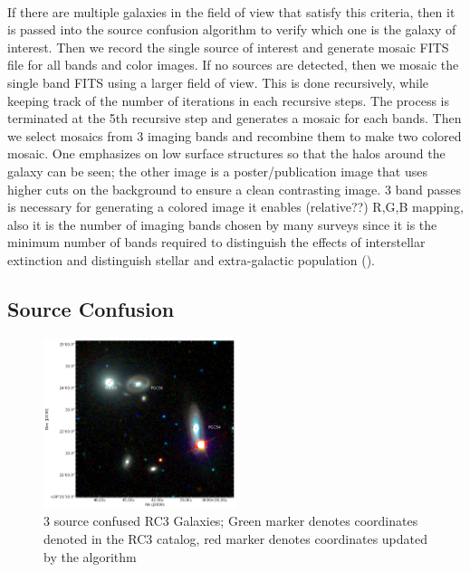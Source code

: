 \documentclass[5p]{elsarticle}
\begin{document}
\\
\indent If there are multiple galaxies in the field of view that satisfy this criteria, then it is passed into the source confusion algorithm to verify which one is the galaxy of interest. Then we record the single source of interest and generate mosaic FITS file for all bands and color images. If no sources are detected, then we mosaic  the single band FITS using a larger field of view. This is done recursively, while keeping track of the number of iterations in each recursive steps. The process is terminated at the 5th recursive step and generates a mosaic for each bands. Then we select mosaics from 3 imaging bands  and recombine them to make two  colored mosaic. One emphasizes on low surface structures  so that the halos around the galaxy can be seen; the other image is a poster/publication image that uses higher cuts on the background to ensure a clean contrasting image. 3 band passes is necessary for generating a colored image it enables (relative??) R,G,B mapping, also it is the number of imaging bands chosen by many surveys since it is the minimum number of bands required to distinguish the effects of interstellar extinction and distinguish stellar and extra-galactic population (\citet{2mass}).
	\subsection{Source Confusion}
		\begin{figure}[h]
		\includegraphics[width=0.5\textwidth]{figures/navigator}
		\caption{3 source confused RC3 Galaxies; Green marker denotes coordinates denoted in the RC3 catalog, red marker denotes coordinates updated by the algorithm}
	\end{figure}
\end{document}

